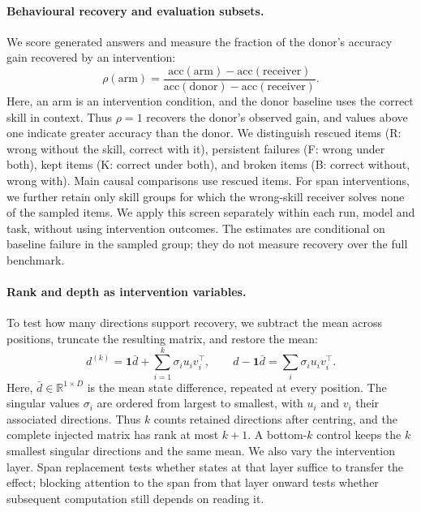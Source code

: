 \documentclass{article}
\newcommand{\dvec}{\ensuremath{d}}
\begin{document}
\paragraph{Behavioural recovery and evaluation subsets.}
We score generated answers and measure the fraction of the donor's accuracy
gain recovered by an intervention:
\begin{equation}
\rho(\mathrm{arm})=
\frac{\mathrm{acc}(\mathrm{arm})-\mathrm{acc}(\mathrm{receiver})}
     {\mathrm{acc}(\mathrm{donor})-\mathrm{acc}(\mathrm{receiver})}.
\label{eq:rho}
\end{equation}
Here, an arm is an intervention condition, and the donor baseline uses the
correct skill in context. Thus $\rho=1$ recovers the donor's observed gain,
and values above one indicate greater accuracy than the donor. We distinguish rescued
items (R: wrong without the skill, correct with it), persistent failures (F:
wrong under both), kept items (K: correct under both), and broken items (B:
correct without, wrong with). Main causal comparisons use rescued items. For
span interventions, we further retain only skill groups for which the
wrong-skill receiver solves none of the sampled items. We apply this screen
separately within each run, model and task, without using intervention outcomes.
The estimates are conditional on baseline failure in the sampled group;
they do not measure recovery over the full benchmark.

\paragraph{Rank and depth as intervention variables.}
To test how many directions support recovery, we subtract the mean across
positions, truncate the resulting matrix, and restore the mean:
\begin{equation}
\dvec^{(k)}=\mathbf{1}\bar{\dvec}+\sum_{i=1}^{k}\sigma_i u_i v_i^\top,
\qquad
\dvec-\mathbf{1}\bar{\dvec}=\sum_i\sigma_i u_i v_i^\top.
\label{eq:rank}
\end{equation}
Here, $\bar{\dvec}\in\mathbb{R}^{1\times D}$ is the mean state difference,
repeated at every position. The singular values $\sigma_i$ are ordered from
largest to smallest, with $u_i$ and $v_i$ their associated directions. Thus $k$
counts retained directions after centring, and the complete injected matrix has
rank at most $k+1$. A bottom-$k$ control keeps the $k$ smallest singular
directions and the same mean. We also vary the intervention layer. Span
replacement tests whether states at that layer suffice to transfer the effect;
blocking attention to the span from that layer onward tests whether subsequent
computation still depends on reading it.
\end{document}

